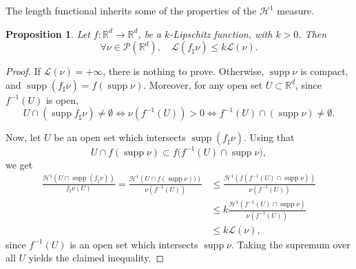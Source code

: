 \documentclass[JEP,XML,SOM,Unicode,NoFloatCountersInSection,published]{cedram}
\newtheorem{proposition}[theorem]{Proposition}
\theoremstyle{definition}
\newcommand\cH{\mathcal{H}}
\newcommand\cL{\mathcal{L}}
\newcommand{\RR}{\mathbb{R}}
\DeclareMathOperator{\supp}{supp}
\begin{document}
The length functional inherits some of the properties of the $\cH^1$ measure.
\begin{proposition}\label{prop.length.lipschitz}
Let $f\colon \RR^d\rightarrow \RR^d$, be a $k$-Lipschitz function, with $k>0$. Then
\begin{equation}
\forall \nu \in \mathcal{P}(\RR^d),\quad \cL(f_\sharp\nu)\leq k \cL(\nu). \label{eq.lipschitzlength}
\end{equation}
\end{proposition}

\begin{proof}
If $\cL(\nu)=+\infty$, there is nothing to prove. Otherwise, $\supp \nu$ is compact, and $\supp(f_\sharp \nu)= f(\supp \nu)$.
Moreover, for any open set $U \subset \RR^d$, since $f^{-1}(U)$ is open,
\begin{equation*}
U\cap \left(\supp f_\sharp \nu\right)\neq \emptyset \iff \nu(f^{-1}(U))>0 \iff f^{-1}(U)\cap \left(\supp \nu\right)\neq \emptyset.
\end{equation*}

Now, let $U$ be an open set which intersects $\supp(f_\sharp \nu)$. Using that
\begin{equation*}
U\cap f(\supp \nu) \subset f\bigl(f^{-1}(U)\cap \supp \nu\bigr),
\end{equation*}
we get
\begin{align*}
\frac{\cH^1\left(U\cap \supp (f_\sharp \nu)\right)}{f_\sharp\nu(U)}= \frac{\cH^1\left(U\cap f(\supp \nu))\right)}{\nu(f^{-1}(U))}
&\leq \frac{\cH^1\left(f\left(f^{-1}(U)\cap \supp \nu\right)\right)}{\nu(f^{-1}(U))}\\
&\leq k\frac{\cH^1\left(f^{-1}(U)\cap \supp \nu\right)}{\nu(f^{-1}(U))}\\
&\leq k\mathcal{L}(\nu),
\end{align*}
since $f^{-1}(U)$ is an open set which intersects $\supp \nu$.
Taking the supremum over all $U$ yields the claimed inequality.
\end{proof}
\end{document}
